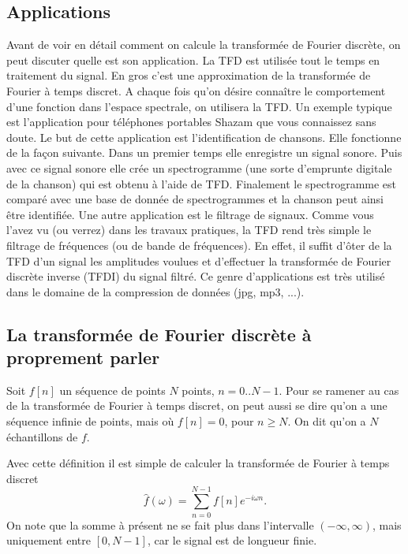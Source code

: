\documentclass[a4paper,12pt]{book}
\newcommand{\fh}{\hat{f}}
\begin{document}
\subsection{Applications}

Avant de voir en détail comment on calcule la transformée de Fourier discrète, 
on peut discuter quelle est son application. La TFD est utilisée tout le temps en traitement du signal.
En gros c'est une approximation de la transformée de Fourier à temps discret. A chaque fois qu'on désire connaître le comportement d'une fonction dans l'espace spectrale, on utilisera la TFD. Un exemple typique 
est l'application pour téléphones portables Shazam que vous connaissez sans doute. Le but de cette application est l'identification de chansons. Elle fonctionne de la façon suivante. Dans un premier temps elle enregistre un signal sonore. Puis avec ce signal sonore elle crée un spectrogramme (une sorte d'emprunte digitale de la chanson) qui est obtenu à l'aide de TFD. Finalement le spectrogramme est comparé avec une base de donnée de spectrogrammes et la chanson peut ainsi être identifiée. Une autre application est le filtrage de signaux. Comme vous l'avez vu (ou verrez) dans les travaux pratiques, 
la TFD rend très simple le filtrage de fréquences (ou de bande de fréquences). En effet, il suffit d'ôter de la TFD d'un signal les amplitudes voulues et d'effectuer la transformée de Fourier discrète inverse (TFDI) du signal filtré. Ce genre d'applications est très utilisé dans le domaine de la compression 
de données (jpg, mp3, ...).

\subsection{La transformée de Fourier discrète à proprement parler}

Soit $f[n]$ un séquence de points $N$ points, $n=0..N-1$. 
Pour se ramener au cas de la transformée de 
Fourier à temps discret, on peut aussi se dire qu'on a une séquence 
infinie de points, mais où $f[n]=0$, pour $n\geq N$. 
On dit qu'on a $N$ échantillons de $f$.

Avec cette définition il est simple de calculer la transformée de Fourier à temps discret
\begin{equation}
 \fh(\omega)=\sum_{n=0}^{N-1} f[n] e^{-i\omega n}.\label{eq_tftd_fini}
\end{equation}
On note que la somme à présent ne se fait plus dans l'intervalle $(-\infty,\infty)$, 
mais uniquement entre $[0,N-1]$, car le signal est de longueur finie.
\end{document}
